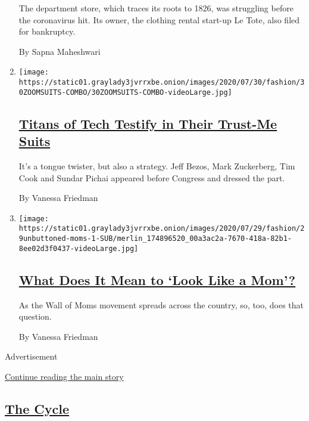 \begin{enumerate}
  The department store, which traces its roots to 1826, was struggling
  before the coronavirus hit. Its owner, the clothing rental start-up Le
  Tote, also filed for bankruptcy.

  By Sapna Maheshwari
\item
  \texttt{[image: https://static01.graylady3jvrrxbe.onion/images/2020/07/30/fashion/30ZOOMSUITS-COMBO/30ZOOMSUITS-COMBO-videoLarge.jpg]}

  \hypertarget{titans-of-tech-testify-in-their-trust-me-suits}{%
  \subsection{\texorpdfstring{\href{/2020/07/29/style/Bezos-zuckerberg-cook-pichai-testimony-suits.html}{Titans
  of Tech Testify in Their Trust-Me
  Suits}}{Titans of Tech Testify in Their Trust-Me Suits}}\label{titans-of-tech-testify-in-their-trust-me-suits}}

  It's a tongue twister, but also a strategy. Jeff Bezos, Mark
  Zuckerberg, Tim Cook and Sundar Pichai appeared before Congress and
  dressed the part.

  By Vanessa Friedman
\item
  \texttt{[image: https://static01.graylady3jvrrxbe.onion/images/2020/07/29/fashion/29unbuttoned-moms-1-SUB/merlin\_174896520\_00a3ac2a-7670-418a-82b1-8ee02d3f0437-videoLarge.jpg]}

  \hypertarget{what-does-it-mean-to-look-like-a-mom}{%
  \subsection{\texorpdfstring{\href{/2020/07/28/style/wall-of-moms-image.html}{What
  Does It Mean to `Look Like a
  Mom'?}}{What Does It Mean to `Look Like a Mom'?}}\label{what-does-it-mean-to-look-like-a-mom}}

  As the Wall of Moms movement spreads across the country, so, too, does
  that question.

  By Vanessa Friedman
\end{enumerate}

Advertisement

\protect\hyperlink{after-mid5}{Continue reading the main story}

\hypertarget{the-cycle}{%
\subsection{\texorpdfstring{\href{/column/the-cycle}{The
Cycle}}{The Cycle}}\label{the-cycle}}

